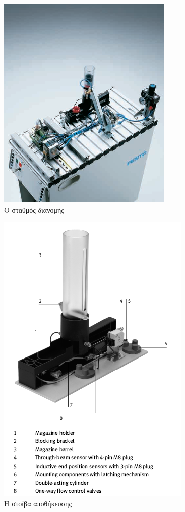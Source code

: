 \documentclass[a4paper,12pt,twoside]{report}
\begin{document}
				\begin{figure}[hp]
					\centering
					\includegraphics[scale=0.25]{DistributionStationFesto.png}
					\caption{Ο σταθμός διανομής \cite{OverviewMPSStations}}
					\label{φωτ:Ο σταθμός διανομής από Festo}
				\end{figure}
				
				\begin{figure}[hp]
					\centering
					\includegraphics[scale=0.75]{StackModuleParts.png}
					\caption{Η στοίβα αποθήκευσης \cite{FestoStackMagazineModuleManual}}
					\label{φωτ:Η στοίβα αποθήκευσης από Festo}
				\end{figure}
				
\end{document}
